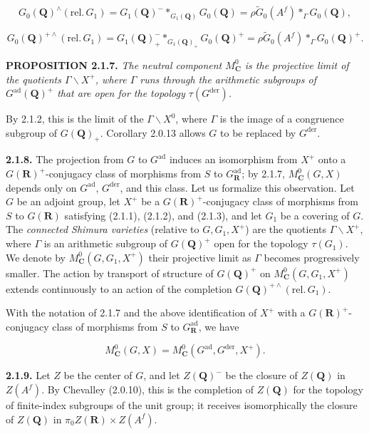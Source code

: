 \documentclass[10pt,a4paper]{article}
\newcommand{\SourcePage}[2]{\clearpage\setcounter{page}{#2}\typeout{D031_SOURCE_PAGE physical=#1 printed=#2}}
\begin{document}
\[
G_0(\mathbf Q)^{\wedge}(\mathrm{rel.}\,G_1)
=G_1(\mathbf Q)^{-}*_{G_1(\mathbf Q)}G_0(\mathbf Q)
=\rho\widetilde G_0(A^f)*_{\Gamma}G_0(\mathbf Q),
\tag{2.1.6.1}
\]

\[
G_0(\mathbf Q)^{+\wedge}(\mathrm{rel.}\,G_1)
=G_1(\mathbf Q)_+^{-}*_{G_1(\mathbf Q)_+}G_0(\mathbf Q)^+
=\rho\widetilde G_0(A^f)*_{\Gamma}G_0(\mathbf Q)^+.
\tag{2.1.6.2}
\]

\textbf{PROPOSITION 2.1.7.} \emph{The neutral component \(M_{\mathbf C}^0\) is the projective limit of the quotients \(\Gamma\backslash X^+\), where \(\Gamma\) runs through the arithmetic subgroups of \(G^{\mathrm{ad}}(\mathbf Q)^+\) that are open for the topology \(\tau(G^{\mathrm{der}})\).}

\SourcePage{21}{267}
By 2.1.2, this is the limit of the \(\Gamma\backslash X^0\), where \(\Gamma\) is the image of a congruence subgroup of \(G(\mathbf Q)_+\). Corollary 2.0.13 allows \(G\) to be replaced by \(G^{\mathrm{der}}\).

\textbf{2.1.8.} The projection from \(G\) to \(G^{\mathrm{ad}}\) induces an isomorphism from \(X^+\) onto a \(G(\mathbf R)^+\)-conjugacy class of morphisms from \(S\) to \(G_{\mathbf R}^{\mathrm{ad}}\); by 2.1.7, \(M_{\mathbf C}^0(G,X)\) depends only on \(G^{\mathrm{ad}}\), \(G^{\mathrm{der}}\), and this class. Let us formalize this observation. Let \(G\) be an adjoint group, let \(X^+\) be a \(G(\mathbf R)^+\)-conjugacy class of morphisms from \(S\) to \(G(\mathbf R)\) satisfying (2.1.1), (2.1.2), and (2.1.3), and let \(G_1\) be a covering of \(G\). The \emph{connected Shimura varieties} (relative to \(G,G_1,X^+\)) are the quotients \(\Gamma\backslash X^+\), where \(\Gamma\) is an arithmetic subgroup of \(G(\mathbf Q)^+\) open for the topology \(\tau(G_1)\). We denote by \(M_{\mathbf C}^0(G,G_1,X^+)\) their projective limit as \(\Gamma\) becomes progressively smaller. The action by transport of structure of \(G(\mathbf Q)^+\) on \(M_{\mathbf C}^0(G,G_1,X^+)\) extends continuously to an action of the completion \(G(\mathbf Q)^{+\wedge}(\mathrm{rel.}\,G_1)\).

With the notation of 2.1.7 and the above identification of \(X^+\) with a \(G(\mathbf R)^+\)-conjugacy class of morphisms from \(S\) to \(G_{\mathbf R}^{\mathrm{ad}}\), we have

\[
M_{\mathbf C}^0(G,X)=M_{\mathbf C}^0(G^{\mathrm{ad}},G^{\mathrm{der}},X^+).
\]

\textbf{2.1.9.} Let \(Z\) be the center of \(G\), and let \(Z(\mathbf Q)^{-}\) be the closure of \(Z(\mathbf Q)\) in \(Z(A^f)\). By Chevalley (2.0.10), this is the completion of \(Z(\mathbf Q)\) for the topology of finite-index subgroups of the unit group; it receives isomorphically the closure of \(Z(\mathbf Q)\) in \(\pi_0Z(\mathbf R)\times Z(A^f)\).
\end{document}

